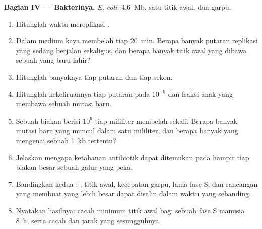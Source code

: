 \begin{problem}
\medskip
\noindent\textbf{Bagian IV --- Bakterinya.}
\emph{E. coli}: \qty{4.6}{Mb}, satu titik awal, dua garpu.
\begin{enumerate}[resume]
  \item Hitunglah waktu mereplikasi .
  \item Dalam medium kaya  membelah tiap \qty{20}{min}. Berapa
        banyak putaran replikasi yang sedang berjalan sekaligus, dan
        berapa banyak titik awal yang dibawa sebuah  yang baru lahir?
  \item Hitunglah banyaknya  tiap putaran dan tiap sekon.
  \item Hitunglah kekeliruannya tiap putaran pada $10^{-9}$ dan fraksi
         anak yang membawa sebuah mutasi baru.
  \item Sebuah biakan berisi $10^9$  tiap mililiter membelah sekali.
        Berapa banyak mutasi baru yang muncul dalam satu mililiter, dan
        berapa banyak yang mengenai sebuah  \qty{1}{kb} tertentu?
  \item Jelaskan mengapa ketahanan antibiotik dapat ditemukan pada
        hampir tiap biakan besar sebuah galur yang peka.
  \item Bandingkan kedua : , titik awal,
        kecepatan garpu, lama fase S, dan rancangan yang membuat 
        yang lebih besar dapat disalin dalam waktu yang sebanding.
  \item Nyatakan hasilnya: cacah minimum titik awal bagi sebuah fase S
        manusia \qty{8}{h}, serta cacah dan jarak yang sesungguhnya.
\end{enumerate}
\end{problem}
